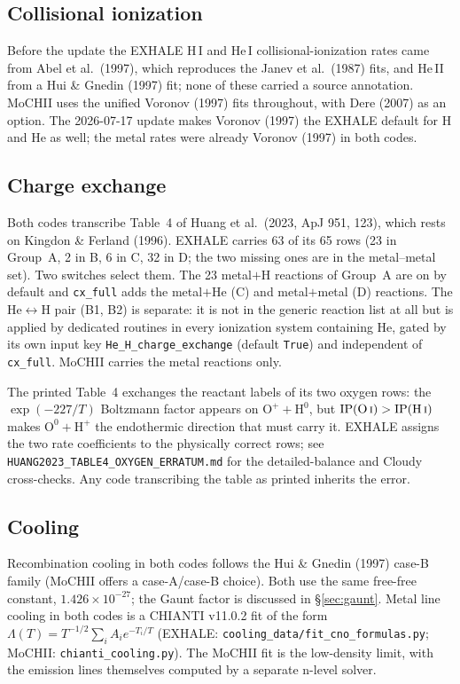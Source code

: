 \documentclass[english,a4paper]{my_memo}
\newcommand{\code}[1]{\texttt{#1}}
\begin{document}
\subsection{Collisional ionization}
Before the update the EXHALE H\,I and He\,I collisional-ionization rates
came from Abel et al.\ (1997), which reproduces the Janev et al.\ (1987)
fits, and He\,II from a Hui \& Gnedin (1997) fit; none of these carried a
source annotation. MoCHII uses the unified Voronov (1997) fits throughout,
with Dere (2007) as an option. The 2026-07-17 update makes Voronov (1997)
the EXHALE default for H and He as well; the metal rates were already
Voronov (1997) in both codes.

\subsection{Charge exchange}
Both codes transcribe Table~4 of Huang et al.\ (2023, ApJ 951, 123), which
rests on Kingdon \& Ferland (1996). EXHALE carries 63 of its 65 rows (23 in
Group~A, 2 in B, 6 in C, 32 in D; the two missing ones are in the
metal--metal set). Two switches select them. The 23 metal$+$H reactions of
Group~A are on by default and \code{cx\_full} adds the metal$+$He (C) and
metal$+$metal (D) reactions. The He$\leftrightarrow$H pair (B1, B2) is separate:
it is not in the generic reaction list at all but is applied by dedicated
routines in every ionization system containing He, gated by its own input key
\code{He\_H\_charge\_exchange} (default \code{True}) and independent of
\code{cx\_full}. MoCHII carries the metal reactions only.

The printed Table~4 exchanges the reactant labels of its two oxygen rows:
the $\exp(-227/T)$ Boltzmann factor appears on $\mathrm{O^+ + H^0}$, but
$\mathrm{IP(O\,\textsc{i})} > \mathrm{IP(H\,\textsc{i})}$ makes
$\mathrm{O^0 + H^+}$ the endothermic direction that must carry it. EXHALE
assigns the two rate coefficients to the physically correct rows; see
\code{HUANG2023\_TABLE4\_OXYGEN\_ERRATUM.md} for the detailed-balance and
Cloudy cross-checks. Any code transcribing the table as printed inherits
the error.

\subsection{Cooling}
Recombination cooling in both codes follows the Hui \& Gnedin (1997)
case-B family (MoCHII offers a case-A/case-B choice). Both use the same
free-free constant, $1.426\times10^{-27}$; the Gaunt factor is discussed
in \S\ref{sec:gaunt}. Metal line cooling in both codes is a CHIANTI
v11.0.2 fit of the form $\Lambda(T)=T^{-1/2}\sum_i A_i e^{-T_i/T}$
(EXHALE: \code{cooling\_data/fit\_cno\_formulas.py}; MoCHII:
\code{chianti\_cooling.py}). The MoCHII fit is the low-density limit, with
the emission lines themselves computed by a separate n-level solver.
\end{document}
